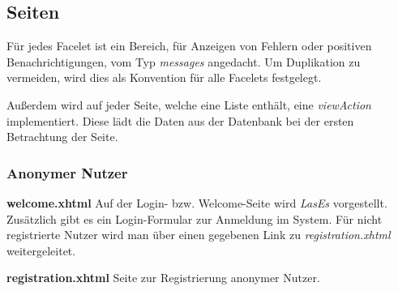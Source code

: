 \subsection{Seiten}  \label{flt:pages}

Für jedes Facelet ist ein Bereich, für Anzeigen von Fehlern oder positiven Benachrichtigungen, vom Typ \emph{messages} angedacht.
Um Duplikation zu vermeiden, wird dies als Konvention für alle Facelets festgelegt.

Außerdem wird auf jeder Seite, welche eine Liste enthält, eine \emph{viewAction} implementiert.
Diese lädt die Daten aus der Datenbank bei der ersten Betrachtung der Seite.

\subsubsection{Anonymer Nutzer}

\begin{samepage}
\textbf{welcome.xhtml} Auf der Login- bzw. Welcome-Seite wird \emph{LasEs} vorgestellt.
Zusätzlich gibt es ein Login-Formular zur Anmeldung im System.
Für nicht registrierte Nutzer wird man über einen gegebenen Link zu \emph{registration.xhtml} weitergeleitet.
\nopagebreak

\end{samepage}

\begin{samepage}
    \textbf{registration.xhtml} Seite zur Registrierung anonymer Nutzer.
    \nopagebreak

\end{samepage}

